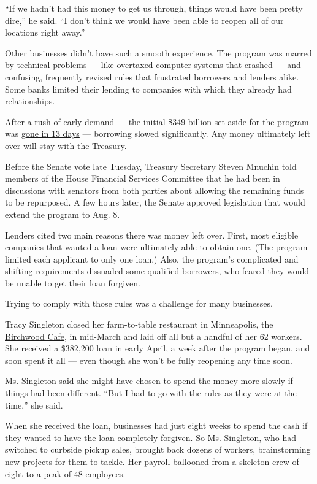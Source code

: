 ``If we hadn't had this money to get us through, things would have been
pretty dire,'' he said. ``I don't think we would have been able to
reopen all of our locations right away.''

Other businesses didn't have such a smooth experience. The program was
marred by technical problems --- like
\href{https://www.nytimes3xbfgragh.onion/2020/04/27/business/sba-loan-system-crash.html}{overtaxed
computer systems that crashed} --- and confusing, frequently revised
rules that frustrated borrowers and lenders alike. Some banks limited
their lending to companies with which they already had relationships.

After a rush of early demand --- the initial \$349 billion set aside for
the program was
\href{https://www.nytimes3xbfgragh.onion/2020/04/16/business/coronavirus-sba-loans-out-of-money.html}{gone
in 13 days} --- borrowing slowed significantly. Any money ultimately
left over will stay with the Treasury.

Before the Senate vote late Tuesday, Treasury Secretary Steven Mnuchin
told members of the House Financial Services Committee that he had been
in discussions with senators from both parties about allowing the
remaining funds to be repurposed. A few hours later, the Senate approved
legislation that would extend the program to Aug. 8.

Lenders cited two main reasons there was money left over. First, most
eligible companies that wanted a loan were ultimately able to obtain
one. (The program limited each applicant to only one loan.) Also, the
program's complicated and shifting requirements dissuaded some qualified
borrowers, who feared they would be unable to get their loan forgiven.

Trying to comply with those rules was a challenge for many businesses.

Tracy Singleton closed her farm-to-table restaurant in Minneapolis, the
\href{https://www.birchwoodcafe.com/}{Birchwood Cafe}, in mid-March and
laid off all but a handful of her 62 workers. She received a \$382,200
loan in early April, a week after the program began, and soon spent it
all --- even though she won't be fully reopening any time soon.

Ms. Singleton said she might have chosen to spend the money more slowly
if things had been different. ``But I had to go with the rules as they
were at the time,'' she said.

When she received the loan, businesses had just eight weeks to spend the
cash if they wanted to have the loan completely forgiven. So Ms.
Singleton, who had switched to curbside pickup sales, brought back
dozens of workers, brainstorming new projects for them to tackle. Her
payroll ballooned from a skeleton crew of eight to a peak of 48
employees.

